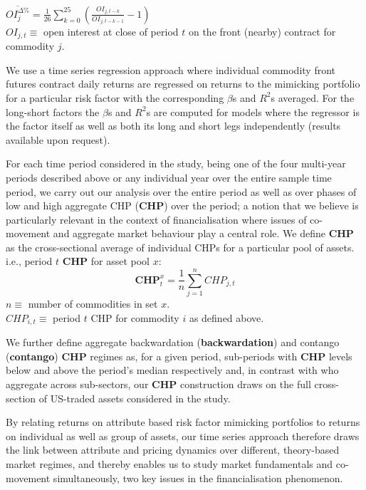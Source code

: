 \documentclass[
  authoryear,
  preprint,
  3p]{elsarticle}
\begin{document}
\(\overline{OI_{j}^{\Delta \%}}=\frac{1}{26}\sum_{k=0}^{25}(\frac{OI_{j,t-k}}{OI_{j,t-k-1}} - 1)\)\\
\(OI_{j,t}\equiv\) open interest at close of period \(t\) on the front
(nearby) contract for commodity \(j\).

\medskip

We use a time series regression approach where individual commodity
front futures contract daily returns are regressed on returns to the
mimicking portfolio for a particular risk factor with the corresponding
\(\beta\)s and \(R^{2}\)s averaged. For the long-short factors the
\(\beta\)s and \(R^{2}\)s are computed for models where the regressor is
the factor itself as well as both its long and short legs independently
(results available upon request).

For each time period considered in the study, being one of the four
multi-year periods described above or any individual year over the
entire sample time period, we carry out our analysis over the entire
period as well as over phases of low and high aggregate CHP
(\textbf{CHP}) over the period; a notion that we believe is particularly
relevant in the context of financialisation where issues of co-movement
and aggregate market behaviour play a central role. We define
\textbf{CHP} as the cross-sectional average of individual CHPs for a
particular pool of assets. i.e., period \(t\) \textbf{CHP} for asset
pool \(x\): \[\mathbf{CHP}_{t}^{x}=\frac{1}{n}\sum_{j=1}^{n}CHP_{j,t}\]
\(n\equiv\) number of commodities in set \(x\).\\
\(CHP_{i,t}\equiv\) period \(t\) CHP for commodity \(i\) as defined
above.

\medskip

We further define aggregate backwardation (\textbf{backwardation}) and
contango (\textbf{contango}) \textbf{CHP} regimes as, for a given
period, sub-periods with \textbf{CHP} levels below and above the
period's median respectively and, in contrast with
\citep{hong_what_2012} who aggregate across sub-sectors, our
\textbf{CHP} construction draws on the full cross-section of US-traded
assets considered in the study.

\bigskip
\bigskip

By relating returns on attribute based risk factor mimicking portfolios
to returns on individual as well as group of assets, our time series
approach therefore draws the link between attribute and pricing dynamics
over different, theory-based market regimes, and thereby enables us to
study market fundamentals and co-movement simultaneously, two key issues
in the financialisation phenomenon.
\end{document}
